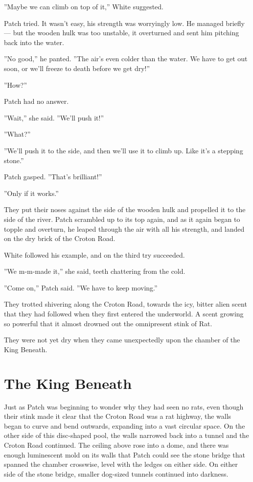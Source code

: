 \documentclass[12pt]{book}
\begin{document}
''Maybe we can climb on top of it,'' White suggested.

Patch tried. It wasn't easy, his strength was worryingly low. He
managed briefly --- but the wooden hulk was too unstable, it
overturned and sent him pitching back into the water.

''No good,'' he panted. ''The air's even colder than the water. We
have to get out soon, or we'll freeze to death before we get dry!''

''How?''

Patch had no answer.

''Wait,'' she said. ''We'll push it!''

''What?''

''We'll push it to the side, and then we'll use it to climb up. Like
it's a stepping stone.''

Patch gasped. ''That's brilliant!''

''Only if it works.''

They put their noses against the side of the wooden hulk and propelled
it to the side of the river. Patch scrambled up to its top again, and
as it again began to topple and overturn, he leaped through the air
with all his strength, and landed on the dry brick of the Croton Road.

White followed his example, and on the third try succeeded.

''We m-m-made it,'' she said, teeth chattering from the cold.

''Come on,'' Patch said. ''We have to keep moving.''

They trotted shivering along the Croton Road, towards the icy, bitter
alien scent that they had followed when they first entered the
underworld. A scent growing so powerful that it almost drowned out the
omnipresent stink of Rat.

They were not yet dry when they came unexpectedly upon the chamber of
the King Beneath.


\section{The King Beneath}

Just as Patch was beginning to wonder why they had seen no rats, even
though their stink made it clear that the Croton Road was a rat
highway, the walls began to curve and bend outwards, expanding into a
vast circular space. On the other side of this disc-shaped pool, the
walls narrowed back into a tunnel and the Croton Road continued. The
ceiling above rose into a dome, and there was enough luminescent mold
on its walls that Patch could see the stone bridge that spanned the
chamber crosswise, level with the ledges on either side. On either
side of the stone bridge, smaller dog-sized tunnels continued into
darkness.
\end{document}
